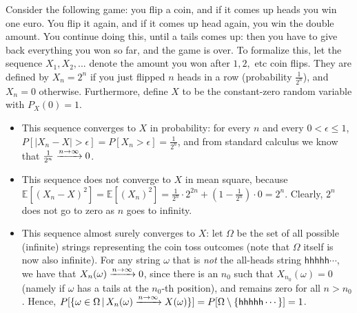 \begin{example}
Consider the following game: you flip a coin, and if it comes up heads you win one euro. You flip it again, and if it comes up head again, you win the double amount. You continue doing this, until a tails comes up: then you have to give back everything you won so far, and the game is over. To formalize this, let the sequence $X_1, X_2, ...$ denote the amount you won after $1, 2, $ etc coin flips. They are defined by $X_n = 2^n$ if you just flipped $n$ heads in a row (probability $\frac{1}{2^n}$), and $X_n = 0$ otherwise. Furthermore, define $X$ to be the constant-zero random variable with $P_X(0) = 1$.

\begin{itemize}
\item This sequence converges to $X$ in probability: for every $n$ and every $0 < \epsilon \leq 1$, $P[|X_n - X| > \epsilon] = P[X_n > \epsilon] = \frac{1}{2^n}$, and from standard calculus we know that $\frac{1}{2^n} \xrightarrow{n \to \infty} 0$.
\item This sequence does not converge to $X$ in mean square, because $\mathbb{E}[(X_n - X)^2] = \mathbb{E}[(X_n)^2] = \frac{1}{2^n} \cdot 2^{2n} + \left(1 - \frac{1}{2^n}\right) \cdot 0 = 2^n$. Clearly, $2^n$ does not go to zero as $n$ goes to infinity.
\item This sequence almost surely converges to $X$: let $\Omega$ be the set of all possible (infinite) strings representing the coin toss outcomes (note that $\Omega$ itself is now also infinite). For any string $\omega$ that is \emph{not} the all-heads string $\mathsf{hhhhh}\cdots$, we have that $X_n(\omega) \xrightarrow{n \to \infty} 0$, since there is an $n_0$ such that $X_{n_0}(\omega) = 0$ (namely if $\omega$ has a tails at the $n_0$-th position), and remains zero for all $n > n_0$. Hence, $P[\{\omega \in \Omega\,|\,X_n(\omega) \xrightarrow{n \to \infty} X(\omega)\}] = P[\Omega \setminus \{\mathsf{hhhhh}\cdots\}] = 1$.
\end{itemize}
\end{example}


